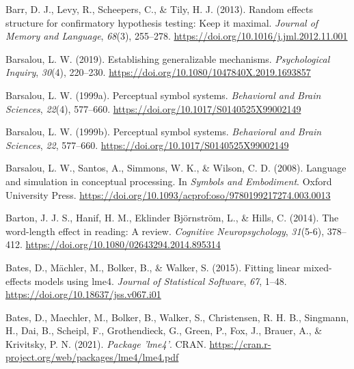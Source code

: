 \documentclass[
  12pt,
  man,floatsintext]{apa7}
\newlength{\cslhangindent}
\newlength{\cslentryspacingunit} %
\newenvironment{CSLReferences}[2] %
 {%
  \setlength{\parindent}{0pt}
  \ifodd #1
  \let\oldpar\par
  \def\par{\hangindent=\cslhangindent\oldpar}
  \fi
  \setlength{\parskip}{#2\cslentryspacingunit}
 }%
 {}
\begin{document}
\begin{CSLReferences}{1}{0}
\leavevmode{}%
Barr, D. J., Levy, R., Scheepers, C., \& Tily, H. J. (2013). Random effects structure for confirmatory hypothesis testing: {Keep} it maximal. \emph{Journal of Memory and Language}, \emph{68}(3), 255--278. \url{https://doi.org/10.1016/j.jml.2012.11.001}

\leavevmode{}%
Barsalou, L. W. (2019). Establishing generalizable mechanisms. \emph{Psychological Inquiry}, \emph{30}(4), 220--230. \url{https://doi.org/10.1080/1047840X.2019.1693857}

\leavevmode{}%
Barsalou, L. W. (1999a). Perceptual symbol systems. \emph{Behavioral and Brain Sciences}, \emph{22}(4), 577--660. \url{https://doi.org/10.1017/S0140525X99002149}

\leavevmode{}%
Barsalou, L. W. (1999b). Perceptual symbol systems. \emph{Behavioral and Brain Sciences}, \emph{22}, 577--660. \url{https://doi.org/10.1017/S0140525X99002149}

\leavevmode{}%
Barsalou, L. W., Santos, A., Simmons, W. K., \& Wilson, C. D. (2008). Language and simulation in conceptual processing. In \emph{Symbols and {Embodiment}}. {Oxford University Press}. \url{https://doi.org/10.1093/acprof:oso/9780199217274.003.0013}

\leavevmode{}%
Barton, J. J. S., Hanif, H. M., Eklinder Björnström, L., \& Hills, C. (2014). The word-length effect in reading: {A} review. \emph{Cognitive Neuropsychology}, \emph{31}(5-6), 378--412. \url{https://doi.org/10.1080/02643294.2014.895314}

\leavevmode{}%
Bates, D., Mächler, M., Bolker, B., \& Walker, S. (2015). Fitting linear mixed-effects models using {lme4}. \emph{Journal of Statistical Software}, \emph{67}, 1--48. \url{https://doi.org/10.18637/jss.v067.i01}

\leavevmode{}%
Bates, D., Maechler, M., Bolker, B., Walker, S., Christensen, R. H. B., Singmann, H., Dai, B., Scheipl, F., Grothendieck, G., Green, P., Fox, J., Brauer, A., \& Krivitsky, P. N. (2021). \emph{Package '{lme4}'}. {CRAN}. \url{https://cran.r-project.org/web/packages/lme4/lme4.pdf}


\end{CSLReferences}
\end{document}
